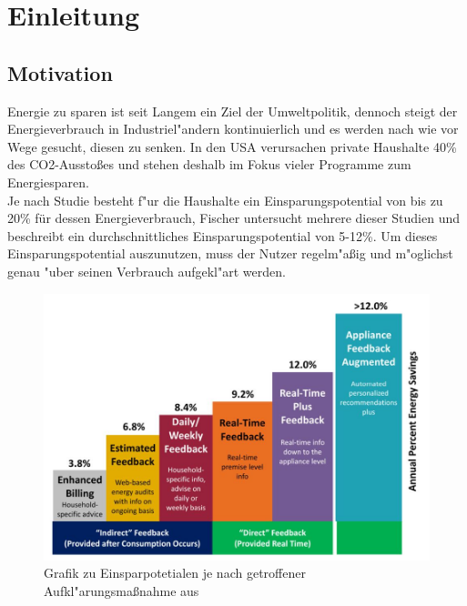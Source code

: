 \section{Einleitung}
\label{Einleitung}

\subsection{Motivation}
\label{Motivation}
	Energie zu sparen ist seit Langem ein Ziel der Umweltpolitik, dennoch steigt der Energieverbrauch in Industriel"andern kontinuierlich und es werden nach wie vor Wege gesucht, diesen zu senken. 
	In den USA verursachen private Haushalte 40\% des CO2-Aussto{\ss}es \cite{vandenbergh2008individual} und stehen deshalb im Fokus vieler Programme zum Energiesparen. \\
	Je nach Studie besteht f"ur die Haushalte ein Einsparungspotential von bis zu 20\% \cite{armel2013disaggregation} für dessen Energieverbrauch, Fischer \cite{fischer2008feedback} untersucht mehrere dieser Studien und beschreibt ein durchschnittliches Einsparungspotential von 5-12\%. 
	Um dieses Einsparungspotential auszunutzen, muss der Nutzer regelm"a{\ss}ig und m"oglichst genau "uber seinen Verbrauch aufgekl"art werden. 	%
	\begin{figure}[ht]
\includegraphics[height=0.7\textwidth]{1_Grafiken/fig1armel.jpg}
	\caption[Einsparungpotentiale nach Ma{\ss}nahme]{Grafik zu Einsparpotetialen je nach getroffener Aufkl"arungsma{\ss}nahme aus \cite{armel2013disaggregation}}
\label{potentiale}
\end{figure}

